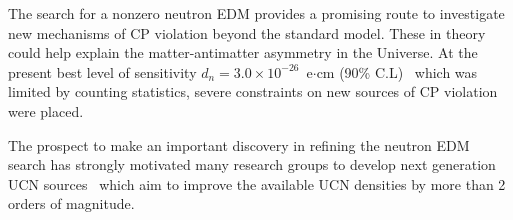 
The search for a nonzero neutron EDM provides a promising route to
investigate new mechanisms of CP violation beyond the standard
model. These in theory could help explain the matter-antimatter
asymmetry in the Universe. At the present best level of sensitivity
$d_n = 3.0 \times 10^{-26}$~e$\cdot$cm (90\%
C.L)~\cite{Pendlebury2015} which was limited by counting
statistics, severe constraints on new sources of CP violation were
placed.


The prospect to make an important discovery in refining the neutron
EDM search has strongly motivated many research groups to develop next
generation UCN sources~\cite{Golub75,Zimmer2011} which aim to
improve the available UCN densities by more than 2 orders of
magnitude.
